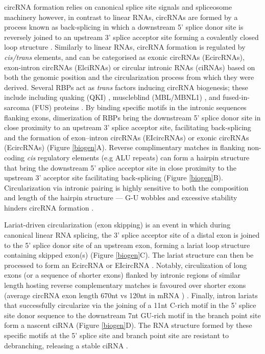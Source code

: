 circRNA formation relies on canonical splice site signals and spliceosome machinery \cite{Starke2015Jan} however, in contrast to linear RNAs, circRNAs are formed by a process known as back-splicing in which a downstream 5' splice donor site is reversely joined to an upstream 3' splice acceptor site forming a covalently closed loop structure \cite{Jeck2012Dec, Jeck2014May}. Similarly to linear RNAs, circRNA formation is regulated by \textit{cis/trans} elements, and can be categorised as exonic circRNAs (EcircRNAs), exon-intron circRNAs (ElciRNAs) or circular intronic RNAs (ciRNAs) based on both the genomic position and the circularization process from which they were derived. Several RBPs act as \textit{trans} factors inducing circRNA biogenesis; these include including quaking (QKI) \cite{Conn2015Mar}, muscleblind (MBL/MBNL1) \cite{Ashwal-Fluss2014Oct}, and fused-in-sarcoma (FUS) proteins \cite{Errichelli2017Mar}. By binding specific motifs in the intronic sequences flanking exons, dimerization of RBPs bring the downstream 5' splice donor site in close proximity to an upstream 3' splice acceptor site, facilitating back-splicing and the formation of exon–intron circRNAs (EIcircRNAs) or exonic circRNAs (EcircRNAs) (Figure \ref{biogen}A). Reverse complimentary matches in flanking non-coding \textit{cis} regulatory elements (e.g ALU repeats) can form a hairpin structure that bring the downstream 5' splice acceptor site in close proximity to the upstream 3' acceptor site facilitating back-splicing \cite{Jeck2012Dec, Wilusz2015May, CIRCexplorer} (Figure \ref{biogen}B). Circularization via intronic pairing is highly sensitive to both the composition and length of the hairpin structure --- G-U wobbles and excessive stability hinders circRNA formation \cite{Liang2014Oct}. \par

Lariat-driven circularization (exon skipping) is an event in which during canonical linear RNA splicing, the 3' splice acceptor site of a distal exon is joined to the 5' splice donor site of an upstream exon, forming a lariat loop structure containing skipped exon(s) (Figure \ref{biogen}C). The lariat structure can then be processed to form an EcircRNA or EIcircRNA \cite{Zaphiropoulos1996}. Notably, circulization of long exons (or a sequence of shorter exons) flanked by intronic regions of similar length hosting reverse complementary matches is favoured over shorter exons (average circRNA exon length 670nt \cite{Jeck2012Dec} vs 120nt in mRNA \cite{Mokry2010Jun}) \cite{Li2019Sep,Pisignano2023Sep}. Finally, intron lariats that successfully circularize via the joining of a 11nt C-rich motif in the 5' splice site donor sequence to the downstream 7nt GU-rich motif in the branch point site form a nascent ciRNA (Figure \ref{biogen}D). The RNA structure formed by these specific motifs at the 5' splice site and branch point site are resistant to debranching, releasing a stable ciRNA \cite{Zhang2013Sep,Talhouarne2014Jul}.

